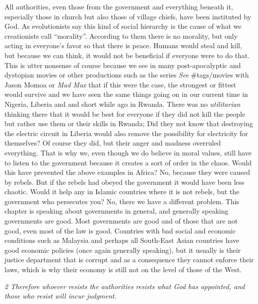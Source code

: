 All authorities, even those from the government and everything beneath
it, especially those in church but also those of village chiefs, have
been instituted by God. As evolutionists say this kind of social
hierarchy is the cause of what we creationists call ``morality''.
According to them there is no morality, but only acting in everyone's
favor so that there is peace. Humans would steal and kill, but because
we can think, it would not be beneficial if everyone were to do that.
This is utter nonsense of course because we see in many post-apocalyptic
and dystopian movies or other productions such as the series \emph{See}
\#tags/movies with Jason Momoa or \emph{Mad Max} that if this were the
case, the strongest or fittest would survive and we have seen the same
things going on in our current time in Nigeria, Liberia and and short
while ago in Rwanda. There was no \emph{utilitarian} thinking there that
it would be best for everyone if they did not kill the people but rather
use them or their skills in Rwanda; Did they not know that destroying
the electric circuit in Liberia would also remove the possibility for
electricity for themselves? Of course they did, but their anger and
madness overruled everything. That is why we, even though we do believe
in moral values, still have to listen to the government because it
creates a sort of order in the chaos. Would this have prevented the
above examples in Africa? No, because they were caused by rebels. But if
the rebels had obeyed the government it would have been less chaotic.
Would it help any in Islamic countries where it is not rebels, but the
government who persecutes you? No, there we have a different problem.
This chapter is speaking about governments in general, and generally
speaking governments are good. Most governments are good and of those
that are not good, even most of the law is good. Countries with bad
social and economic conditions such as Malaysia and perhaps all
South-East Asian countries have good economic policies (once again
generally speaking), but it usually is their justice department that is
corrupt and as a consequence they cannot enforce their laws, which is
why their economy is still not on the level of those of the West.

\emph{2 Therefore whoever resists the authorities resists what God has
appointed, and those who resist will incur judgment.}

